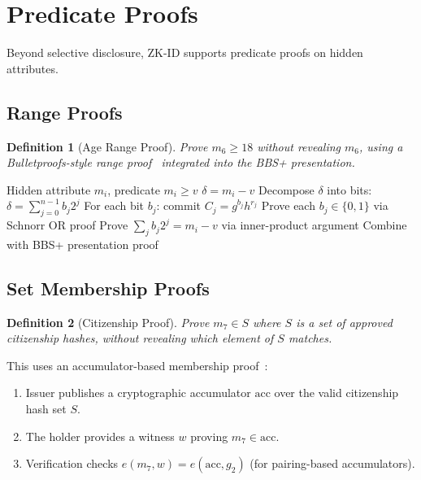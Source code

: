 \documentclass[11pt,a4paper]{article}
\newtheorem{definition}{Definition}[section]
\begin{document}
\section{Predicate Proofs}
\label{sec:predicates}

Beyond selective disclosure, ZK-ID supports predicate proofs on hidden
attributes.

\subsection{Range Proofs}

\begin{definition}[Age Range Proof]
    Prove $m_6 \geq 18$ without revealing $m_6$, using a Bulletproofs-style
    range proof~\cite{bunz2018bulletproofs} integrated into the BBS+
    presentation.
\end{definition}

\begin{algorithm}[H]
\caption{Range Predicate Proof}
\label{alg:range}
\begin{algorithmic}[1]
\Require Hidden attribute $m_i$, predicate $m_i \geq v$
\State $\delta = m_i - v$ 
\State Decompose $\delta$ into bits: $\delta = \sum_{j=0}^{n-1} b_j 2^j$
\State For each bit $b_j$: commit $C_j = g^{b_j} h^{r_j}$
\State Prove each $b_j \in \{0, 1\}$ via Schnorr OR proof
\State Prove $\sum_{j} b_j 2^j = m_i - v$ via inner-product argument
\State Combine with BBS+ presentation proof
\end{algorithmic}
\end{algorithm}

\subsection{Set Membership Proofs}

\begin{definition}[Citizenship Proof]
    Prove $m_7 \in S$ where $S$ is a set of approved citizenship hashes,
    without revealing which element of $S$ matches.
\end{definition}

This uses an accumulator-based membership
proof~\cite{camenisch2002dynamic}:

\begin{enumerate}
    \item Issuer publishes a cryptographic accumulator $\mathrm{acc}$ over
    the valid citizenship hash set $S$.
    \item The holder provides a witness $w$ proving $m_7 \in \mathrm{acc}$.
    \item Verification checks $e(m_7, w) = e(\mathrm{acc}, g_2)$ (for
    pairing-based accumulators).
\end{enumerate}
\end{document}
